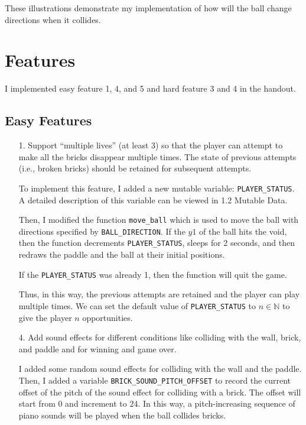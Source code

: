 \documentclass{article}
\newcommand{\N}{\mathbb{N}}
\newcommand{\code}[1]{\texttt{#1}}
\begin{document}
These illustrations demonstrate my implementation of how will the ball change directions when it collides.

\section{Features}

I implemented easy feature 1, 4, and 5 and hard feature 3 and 4 in the handout.

\subsection{Easy Features}

\begin{enumerate}
    \item[1.] Support ``multiple lives'' (at least 3) so that the player can attempt to make all the bricks disappear multiple times. The state of previous attempts (i.e., broken bricks) should be retained for subsequent attempts.
    
    To implement this feature, I added a new mutable variable: \code{PLAYER\_STATUS}. A detailed description of this variable can be viewed in 1.2 Mutable Data. 
    
    Then, I modified the function \code{move\_ball} which is used to move the ball with directions specified by \code{BALL\_DIRECTION}. If the $y1$ of the ball hits the void, then the function decrements \code{PLAYER\_STATUS}, sleeps for 2 seconds, and then redraws the paddle and the ball at their initial positions. 

    If the \code{PLAYER\_STATUS} was already 1, then the function will quit the game.

    Thus, in this way, the previous attempts are retained and the player can play multiple times. We can set the default value of \code{PLAYER\_STATUS} to $n \in \N$ to give the player $n$ opportunities.

    \item[4.] Add sound effects for different conditions like colliding with the wall, brick, and paddle and for winning and game over.
    
    I added some random sound effects for colliding with the wall and the paddle. Then, I added a variable \code{BRICK\_SOUND\_PITCH\_OFFSET} to record the current offset of the pitch of the sound effect for colliding with a brick. The offset will start from 0 and increment to 24. In this way, a pitch-increasing sequence of piano sounds will be played when the ball collides bricks. 


\end{enumerate}
\end{document}
